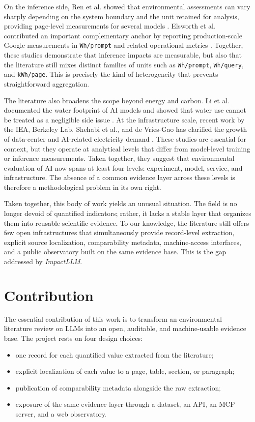 \documentclass[11pt,a4paper]{article}
\begin{document}
On the inference side, Ren et al. showed that environmental assessments can vary sharply depending on the system boundary and the unit retained for analysis, providing page-level measurements for several models \cite{ren2024}. Elsworth et al. contributed an important complementary anchor by reporting production-scale Google measurements in \texttt{Wh/prompt} and related operational metrics \cite{elsworth2025}. Together, these studies demonstrate that inference impacts are measurable, but also that the literature still mixes distinct families of units such as \texttt{Wh/prompt}, \texttt{Wh/query}, and \texttt{kWh/page}. This is precisely the kind of heterogeneity that prevents straightforward aggregation.

The literature also broadens the scope beyond energy and carbon. Li et al. documented the water footprint of AI models and showed that water use cannot be treated as a negligible side issue \cite{li2025water}. At the infrastructure scale, recent work by the IEA, Berkeley Lab, Shehabi et al., and de Vries-Gao has clarified the growth of data-center and AI-related electricity demand \cite{iea2025,shehabi2024report,lbl2025,devriesgao2025joule}. These studies are essential for context, but they operate at analytical levels that differ from model-level training or inference measurements. Taken together, they suggest that environmental evaluation of AI now spans at least four levels: experiment, model, service, and infrastructure. The absence of a common evidence layer across these levels is therefore a methodological problem in its own right.

Taken together, this body of work yields an unusual situation. The field is no longer devoid of quantified indicators; rather, it lacks a stable layer that organizes them into reusable scientific evidence. To our knowledge, the literature still offers few open infrastructures that simultaneously provide record-level extraction, explicit source localization, comparability metadata, machine-access interfaces, and a public observatory built on the same evidence base. This is the gap addressed by \emph{ImpactLLM}.

\section{Contribution}
The essential contribution of this work is to transform an environmental literature review on LLMs into an open, auditable, and machine-usable evidence base. The project rests on four design choices:
\begin{itemize}
\item one record for each quantified value extracted from the literature;
\item explicit localization of each value to a page, table, section, or paragraph;
\item publication of comparability metadata alongside the raw extraction;
\item exposure of the same evidence layer through a dataset, an API, an MCP server, and a web observatory.
\end{itemize}
\end{document}
